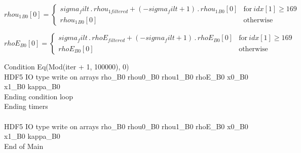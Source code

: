 \documentclass{article}
\begin{document}
\begin{dmath}{rhou_{1}{_{B0}}}[{0}] = \begin{cases} sigma_filt \,.\, rhou_{1 filtered} + \left(- sigma_filt + 1\right) \,.\, {rhou_{1}{_{B0}}}[{0}] & \text{for}\: {idx}[{1}] \geq 169 \\{rhou_{1}{_{B0}}}[{0}] & \text{otherwise} \end{cases}\end{dmath}

\begin{dmath}{rhoE{_{B0}}}[{0}] = \begin{cases} sigma_filt \,.\, rhoE_{filtered} + \left(- sigma_filt + 1\right) \,.\, {rhoE{_{B0}}}[{0}] & \text{for}\: {idx}[{1}] \geq 169 \\{rhoE{_{B0}}}[{0}] & \text{otherwise} \end{cases}\end{dmath}

\noindent Condition Eq(Mod(iter + 1, 100000), 0)\\\noindent HDF5 IO type write on arrays rho_B0 rhou0_B0 rhou1_B0 rhoE_B0 x0_B0 x1_B0 kappa_B0\\\noindent Ending condition loop %
\\\noindent Ending timers\\
\\\noindent HDF5 IO type write on arrays rho_B0 rhou0_B0 rhou1_B0 rhoE_B0 x0_B0 x1_B0 kappa_B0\\\noindent End of Main\\
\end{document}

